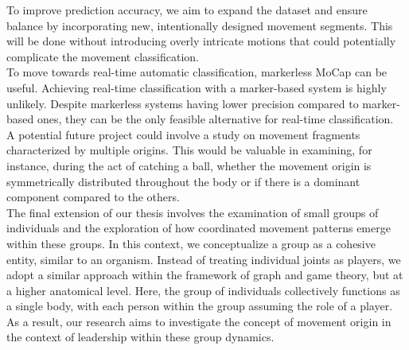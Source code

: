 To improve prediction accuracy, we aim to expand the dataset and ensure balance by incorporating new, intentionally designed movement segments.
This will be done without introducing overly intricate motions that could potentially complicate the movement classification.
\\
To move towards real-time automatic classification, markerless MoCap can be useful.
Achieving real-time classification with a marker-based system is highly unlikely.
Despite markerless systems having lower precision compared to marker-based ones, they can be the only feasible alternative for real-time classification.
\\
A potential future project could involve a study on movement fragments characterized by multiple origins.
This would be valuable in examining, for instance, during the act of catching a ball, whether the movement origin is symmetrically distributed throughout the body or if there is a dominant component compared to the others.
\\
The final extension of our thesis involves the examination of small groups of individuals and the exploration of how coordinated movement patterns emerge within these groups.
In this context, we conceptualize a group as a cohesive entity, similar to an organism.
Instead of treating individual joints as players, we adopt a similar approach within the framework of graph and game theory, but at a higher anatomical level.
Here, the group of individuals collectively functions as a single body, with each person within the group assuming the role of a player.
As a result, our research aims to investigate the concept of movement origin in the context of leadership within these group dynamics.